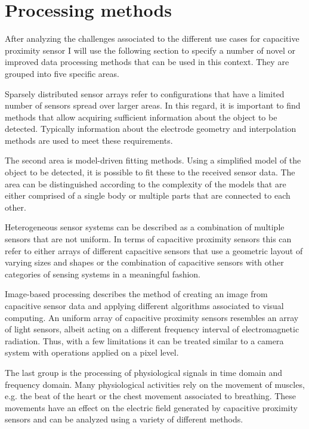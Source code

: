 \section{Processing methods}
\label{ch:prot_proc}
After analyzing the challenges associated to the different use cases for capacitive proximity sensor I will use the following section to specify a number of novel or improved data processing methods that can be used in this context. They are grouped into five specific areas.

Sparsely distributed sensor arrays refer to configurations that have a limited number of sensors spread over larger areas. In this regard, it is important to find methods that allow acquiring sufficient information about the object to be detected. Typically information about the electrode geometry and interpolation methods are used to meet these requirements.

The second area is model-driven fitting methods. Using a simplified model of the object to be detected, it is possible to fit these to the received sensor data. The area can be distinguished according to the complexity of the models that are either comprised of a single body or multiple parts that are connected to each other.

Heterogeneous sensor systems can be described as a combination of multiple sensors that are not uniform. In terms of capacitive proximity sensors this can refer to either arrays of different capacitive sensors that use a geometric layout of varying sizes and shapes or the combination of capacitive sensors with other categories of sensing systems in a meaningful fashion.

Image-based processing describes the method of creating an image from capacitive sensor data and applying different algorithms associated to visual computing. An uniform array of capacitive proximity sensors resembles an array of light sensors, albeit acting on a different frequency interval of electromagnetic radiation. Thus, with a few limitations it can be treated similar to a camera system with operations applied on a pixel level.

The last group is the processing of physiological signals in time domain and frequency domain. Many physiological activities rely on the movement of muscles, e.g. the beat of the heart or the chest movement associated to breathing. These movements have an effect on the electric field generated by capacitive proximity sensors and can be analyzed using a variety of different methods.








